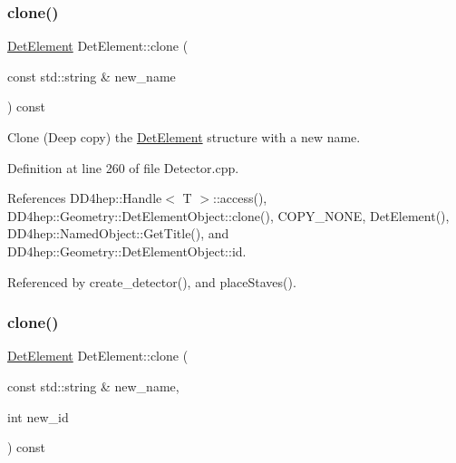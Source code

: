 \hypertarget{class_d_d4hep_1_1_geometry_1_1_det_element_a652d67b71b8eb61044567e9dc48ee60b}{}\label{class_d_d4hep_1_1_geometry_1_1_det_element_a652d67b71b8eb61044567e9dc48ee60b} 
\subsubsection{\texorpdfstring{clone()}{clone()}\hspace{0.1cm}{\footnotesize\ttfamily [1/2]}}
{\footnotesize\ttfamily \hyperlink{class_d_d4hep_1_1_geometry_1_1_det_element}{Det\+Element} Det\+Element\+::clone (\begin{DoxyParamCaption}\item[{const std\+::string \&}]{new\+\_\+name }\end{DoxyParamCaption}) const}



Clone (Deep copy) the \hyperlink{class_d_d4hep_1_1_geometry_1_1_det_element}{Det\+Element} structure with a new name. 



Definition at line 260 of file Detector.\+cpp.



References D\+D4hep\+::\+Handle$<$ T $>$\+::access(), D\+D4hep\+::\+Geometry\+::\+Det\+Element\+Object\+::clone(), C\+O\+P\+Y\+\_\+\+N\+O\+NE, Det\+Element(), D\+D4hep\+::\+Named\+Object\+::\+Get\+Title(), and D\+D4hep\+::\+Geometry\+::\+Det\+Element\+Object\+::id.



Referenced by create\+\_\+detector(), and place\+Staves().

\hypertarget{class_d_d4hep_1_1_geometry_1_1_det_element_ac946f1a284bb734c093e20d8968e064e}{}\label{class_d_d4hep_1_1_geometry_1_1_det_element_ac946f1a284bb734c093e20d8968e064e} 
\subsubsection{\texorpdfstring{clone()}{clone()}\hspace{0.1cm}{\footnotesize\ttfamily [2/2]}}
{\footnotesize\ttfamily \hyperlink{class_d_d4hep_1_1_geometry_1_1_det_element}{Det\+Element} Det\+Element\+::clone (\begin{DoxyParamCaption}\item[{const std\+::string \&}]{new\+\_\+name,  }\item[{int}]{new\+\_\+id }\end{DoxyParamCaption}) const}



